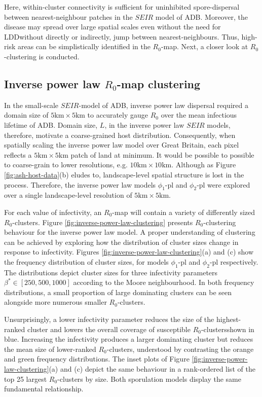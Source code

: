 Here, within-cluster connectivity is sufficient for uninhibited spore-dispersal between nearest-neighbour patches in the $SEIR$ model of ADB.
Moreover, the disease may spread over large spatial scales even without the need for LDD\textemdash without directly or indirectly, jump between nearest-neighbours.
Thus, high-risk areas can be simplistically identified in the $R_0$-map.
Next, a closer look at $R_0$-clustering is conducted.

\subsection{Inverse power law $R_0$-map clustering}
\label{sec:inverse-power-law-r0-clustering}

In the small-scale $SEIR$-model of ADB, inverse power law dispersal required a domain size of $\mathrm{5km \times 5km}$ to accurately gauge $R_0$ over the mean infectious lifetime of ADB.
Domain size, $L$, in the inverse power law $SEIR$ models, therefore, motivate a coarse-grained host distribution.
Consequently, when spatially scaling the inverse power law model over Great Britain, each pixel reflects a $\mathrm{5km \times 5km}$ patch of land at minimum.
It would be possible to possible to coarse-grain to lower resolutions, e.g. $\mathrm{10km \times 10km}$.
Although as Figure \ref{fig:ash-host-data}(b) eludes to, landscape-level spatial structure is lost in the process.
Therefore, the inverse power law models $\phi_1$-pl and $\phi_2$-pl were explored over a single landscape-level resolution of $\mathrm{5km \times 5km}$.

For each value of infectivity, an $R_0$-map will contain a variety of differently sized $R_0$-clusters.
Figure \ref{fig:inverse-power-law-clustering} presents $R_0$-clustering behaviour for the inverse power law model.
A proper understanding of clustering can be achieved by exploring how the distribution of cluster sizes change in response to infectivity. 
Figures \ref{fig:inverse-power-law-clustering}(a) and (c) show the frequency distribution of cluster sizes, 
for models $\phi_1$-pl and $\phi_2$-pl respectively.
The distributions depict cluster sizes for three infectivity parameters $\beta^* \in [250, 500, 1000]$ according to the Moore neighbourhood.
In both frequency distributions, a small proportion of large dominating clusters can be seen alongside more numerous smaller $R_0$-clusters.

Unsurprisingly, a lower infectivity parameter reduces the size of the highest-ranked cluster and lowers the overall coverage of susceptible $R_0$-clusters\textemdash shown in blue.
Increasing the infectivity produces a larger dominating cluster but reduces the mean size of lower-ranked $R_0$-clusters, 
understood by contrasting the orange and green frequency distributions.
The inset plots of Figure \ref{fig:inverse-power-law-clustering}(a) and (c) depict the same behaviour in a rank-ordered list of the top 25 largest $R_0$-clusters by size.
Both sporulation models display the same fundamental relationship.

